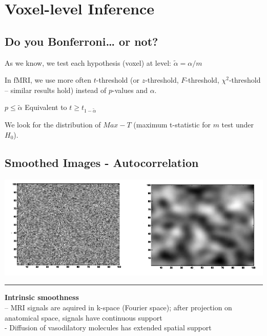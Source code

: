 \documentclass[]{article}
\begin{document}
\section{Voxel-level Inference}\label{voxel-level-inference-1}

\subsection{Do you Bonferroni\ldots{} or
not?}\label{do-you-bonferroni-or-not}

As we know, we test each hypothesis (voxel) at level:
\(\widetilde{\alpha} = \alpha/m\)

In fMRI, we use more often \(t\)-threshold (or \(z\)-threshold,
\(F\)-threshold, \(\chi^2\)-threshold -- similar results hold) instead
of \(p\)-values and \(\alpha\).

\(p\leq \widetilde{\alpha}\) Equivalent to
\(t\geq t_{1-\widetilde{\alpha}}\)

We look for the distribution of \(Max-T\) (maximum t-statistic for \(m\)
test under \(H_0\)).

\subsection{Smoothed Images -
Autocorrelation}\label{smoothed-images---autocorrelation}

\begin{center}\includegraphics[width=700px]{./figs/indep_vs_smoothed} \end{center}

\begin{center}\rule{0.5\linewidth}{\linethickness}\end{center}

\textbf{Intrinsic smoothness}\\
-- MRI signals are aquired in k-space (Fourier space); after projection
on anatomical space, signals have continuous support\\
- Diffusion of vasodilatory molecules has extended spatial support
\end{document}
